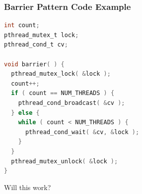 \begin{frame}[fragile]
	\frametitle{Barrier Pattern Code Example}
	\begin{lstlisting}[language=C]
int count;
pthread_mutex_t lock;
pthread_cond_t cv;

void barrier( ) {
  pthread_mutex_lock( &lock );
  count++;
  if ( count == NUM_THREADS ) {
    pthread_cond_broadcast( &cv );
  } else {
    while ( count < NUM_THREADS ) {
      pthread_cond_wait( &cv, &lock );
    }
  }
  pthread_mutex_unlock( &lock );
}
\end{lstlisting}

	Will this work?

\end{frame}


